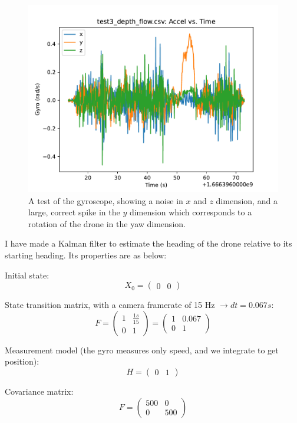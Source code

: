 \begin{figure}
	\includegraphics[width=\linewidth]{./images/test3_depth_flow_depth_gyro.pdf}
	\caption{A test of the gyroscope, showing a noise in $x$ and $z$ dimension,
	and a large, correct spike in the $y$ dimension which corresponds to a rotation of the drone
	in the yaw dimension.}
	\label{figure:test3_depth_gyro}
\end{figure}

I have made a Kalman filter to estimate the heading of the drone relative to its starting heading.
Its properties are as below:

Initial state:
$$X_0 =
\left(
\begin{matrix}
	0 & 0
\end{matrix}
\right)
$$

State transition matrix, with a camera framerate of 15 Hz $\rightarrow dt=0.067s$:
$$
F =
\left(
\begin{matrix}
	1 & \frac{1s}{15} \\
	0 & 1
\end{matrix}
\right)
=
\left(
\begin{matrix}
	1 & 0.067 \\
	0 & 1
\end{matrix}
\right)
$$

Measurement model (the gyro measures only speed, and we integrate to get position):
$$H =
\left(
\begin{matrix}
	0 & 1
\end{matrix}
\right)
$$

Covariance matrix:
$$
F =
\left(
\begin{matrix}
	500 & 0\\
	0 & 500
\end{matrix}
\right)
$$

